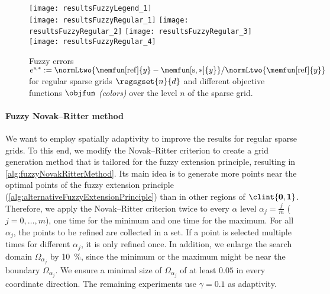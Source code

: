 \begin{figure}
  \texttt{[image: resultsFuzzyLegend\_1]}\\[2mm]%
  \texttt{[image: resultsFuzzyRegular\_1]}%
  \hfill%
  \texttt{[image: resultsFuzzyRegular\_2]}%
  \hfill%
  \texttt{[image: resultsFuzzyRegular\_3]}%
  \hfill%
  \texttt{[image: resultsFuzzyRegular\_4]}%
  \caption[Fuzzy errors for regular sparse grids]{%
    Fuzzy errors
    $e^{\sparse,\ast}
    := \normLtwo{\memfun[\reference]{y} - \memfun[\sparse,\ast]{y}}/
    \normLtwo{\memfun[\reference]{y}}$
    for regular sparse grids $\regsgset{n}{d}$
    and different objective functions $\objfun$ \emph{(colors)}
    over the level $n$ of the sparse grid.%
  }%
  \label{fig:resultsFuzzyRegular}%
\end{figure}

\paragraph{Fuzzy Novak--Ritter method}

We want to employ spatially adaptivity to improve the results
for regular sparse grids.
To this end, we modify the Novak--Ritter criterion
to create a grid generation method that is tailored for the
fuzzy extension principle, resulting in \cref{alg:fuzzyNovakRitterMethod}.
Its main idea is to generate more points near the optimal points
of the fuzzy extension principle
(\cref{alg:alternativeFuzzyExtensionPrinciple}) than in other regions
of $\clint{\*0, \*1}$.
Therefore, we apply the Novak--Ritter criterion twice to
every $\alpha$ level $\alpha_j = \tfrac{j}{m}$ ($j = 0, \dotsc, m$),
one time for the minimum and one time for the maximum.
For all $\alpha_j$, the points to be refined are collected in a set.
If a point is selected multiple times for different $\alpha_j$,
it is only refined once.
In addition, we enlarge the search domain $\Omega_{\alpha_j}$
by \SI{10}{\percent}, since the minimum or the maximum might be
near the boundary $\Omega_{\alpha_j}$.
We ensure a minimal size of $\Omega_{\alpha_j}$ of at least $0.05$
in every coordinate direction.
The remaining experiments use $\gamma = 0.1$ as adaptivity.

